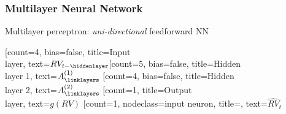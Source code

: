 \documentclass[handout]{beamer}
\begin{document}
\begin{frame}
\frametitle{Multilayer Neural Network}
Multilayer perceptron: \textit{uni-directional} feedforward NN
\vspace{10mm}

\begin{neuralnetwork}[height=5]
\newcommand{\x}[2]{$RV_{t-#2}$}
\newcommand{\y}[2]{$g(RV)$}
\newcommand{\hone}[2]{$A^{(1)}_#2$}
\newcommand{\htwo}[2]{$A^{(2)}_#2$}
\newcommand{\w}[4]{$w_{#2#4}$}
\newcommand{\B}[4]{$\beta_#2$}
\newcommand{\naught}[4]{}
\newcommand{\nodetexty}[2]{$\widehat{RV}_t$}
\setdefaultlinklabel{\naught}
[count=4, bias=false, title=Input\\layer, text=\x]
\hiddenlayer[count=5, bias=false, title=Hidden\\layer 1, text=\hone]
\linklayers
\hiddenlayer[count=4, bias=false, title=Hidden\\layer 2, text=\htwo]
\linklayers
\outputlayer[count=1, title=Output\\layer,  text=\y] 
\linklayers
\outputlayer[count=1, nodeclass={input neuron}, title=\nodetexclear, text=\nodetexty]  
\linklayers
\end{neuralnetwork}
\end{frame}
\end{document}
